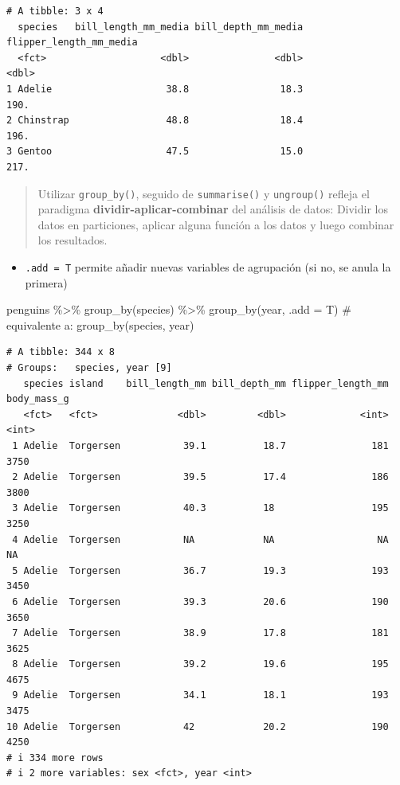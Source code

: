 \documentclass[
  letterpaper,
  DIV=11,
  numbers=noendperiod]{scrreprt}
\newenvironment{Shaded}{\begin{snugshade}}{\end{snugshade}}
\newcommand{\AttributeTok}[1]{\textcolor[rgb]{0.40,0.45,0.13}{#1}}
\newcommand{\CommentTok}[1]{\textcolor[rgb]{0.37,0.37,0.37}{#1}}
\newcommand{\FunctionTok}[1]{\textcolor[rgb]{0.28,0.35,0.67}{#1}}
\newcommand{\NormalTok}[1]{\textcolor[rgb]{0.00,0.23,0.31}{#1}}
\newcommand{\SpecialCharTok}[1]{\textcolor[rgb]{0.37,0.37,0.37}{#1}}
\providecommand{\tightlist}{%
  \setlength{\itemsep}{0pt}\setlength{\parskip}{0pt}}\usepackage{longtable,booktabs,array}
\begin{document}
\begin{verbatim}
# A tibble: 3 x 4
  species   bill_length_mm_media bill_depth_mm_media flipper_length_mm_media
  <fct>                    <dbl>               <dbl>                   <dbl>
1 Adelie                    38.8                18.3                    190.
2 Chinstrap                 48.8                18.4                    196.
3 Gentoo                    47.5                15.0                    217.
\end{verbatim}

\begin{quote}
Utilizar \texttt{group\_by()}, seguido de \texttt{summarise()} y
\texttt{ungroup()} refleja el paradigma
\textbf{dividir-aplicar-combinar} del análisis de datos: Dividir los
datos en particiones, aplicar alguna función a los datos y luego
combinar los resultados.
\end{quote}

\begin{itemize}
\tightlist
\item
  \texttt{.add\ =\ T} permite añadir nuevas variables de agrupación (si
  no, se anula la primera)
\end{itemize}

\begin{Shaded}
\begin{Highlighting}[]
\NormalTok{penguins }\SpecialCharTok{\%\textgreater{}\%} 
  \FunctionTok{group\_by}\NormalTok{(species) }\SpecialCharTok{\%\textgreater{}\%} 
  \FunctionTok{group\_by}\NormalTok{(year, }\AttributeTok{.add =}\NormalTok{ T)   }\CommentTok{\# equivalente a: group\_by(species, year)}
\end{Highlighting}
\end{Shaded}

\begin{verbatim}
# A tibble: 344 x 8
# Groups:   species, year [9]
   species island    bill_length_mm bill_depth_mm flipper_length_mm body_mass_g
   <fct>   <fct>              <dbl>         <dbl>             <int>       <int>
 1 Adelie  Torgersen           39.1          18.7               181        3750
 2 Adelie  Torgersen           39.5          17.4               186        3800
 3 Adelie  Torgersen           40.3          18                 195        3250
 4 Adelie  Torgersen           NA            NA                  NA          NA
 5 Adelie  Torgersen           36.7          19.3               193        3450
 6 Adelie  Torgersen           39.3          20.6               190        3650
 7 Adelie  Torgersen           38.9          17.8               181        3625
 8 Adelie  Torgersen           39.2          19.6               195        4675
 9 Adelie  Torgersen           34.1          18.1               193        3475
10 Adelie  Torgersen           42            20.2               190        4250
# i 334 more rows
# i 2 more variables: sex <fct>, year <int>
\end{verbatim}
\end{document}
